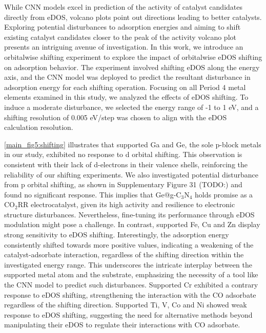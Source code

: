 While CNN models excel in prediction of the activity of catalyst candidates directly from eDOS, volcano plots point out directions leading to better catalysts.
Exploring potential disturbances to adsorption energies and aiming to shift existing catalyst candidates closer to the peak of the activity volcano plot presents an intriguing avenue of investigation.
In this work, we introduce an orbitalwise shifting experiment to explore the impact of orbitalwise eDOS shifting on adsorption behavior.
The experiment involved shifting eDOS along the energy axis, and the CNN model was deployed to predict the resultant disturbance in adsorption energy for each shifting operation.
Focusing on all Period 4 metal elements examined in this study, we analyzed the effects of eDOS shifting.
To induce a moderate disturbance, we selected the energy range of -1 to 1 eV, and a shifting resolution of 0.005 eV/step was chosen to align with the eDOS calculation resolution.

\cref{main_fig5:shifting} illustrates that supported Ga and Ge, the sole p-block metals in our study, exhibited no response to d orbital shifting.
This observation is consistent with their lack of d-electrons in their valence shells, reinforcing the reliability of our shifting experiments.
We also investigated potential disturbance from p orbital shifting, as shown in Supplementary Figure 31 (TODO:) and found no significant response.
This implies that Ge@g-C$_3$N$_4$ holds promise as a CO$_2$RR electrocatalyst, given its high activity and resilience to electronic structure disturbances.
Nevertheless, fine-tuning its performance through eDOS modulation might pose a challenge.
In contrast, supported Fe, Cu and Zn display strong sensitivity to eDOS shifting.
Interestingly, the adsorption energy consistently shifted towards more positive values, indicating a weakening of the catalyst-adsorbate interaction, regardless of the shifting direction within the investigated energy range.
This underscores the intricate interplay between the supported metal atom and the substrate, emphasizing the necessity of a tool like the CNN model to predict such disturbances.
Supported Cr exhibited a contrary response to eDOS shifting, strengthening the interaction with the CO adsorbate regardless of the shifting direction.
Supported Ti, V, Co and Ni showed weak response to eDOS shifting, suggesting the need for alternative methods beyond manipulating their eDOS to regulate their interactions with CO adsorbate.

